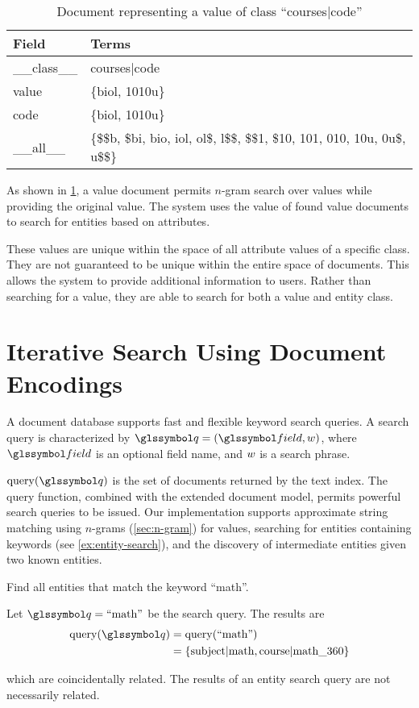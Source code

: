		\begin{table}[H]
			\centering
			\begin{tabular}{ll}
				\toprule
				Field & Terms \\
				\midrule
				\_\_class\_\_ & courses|code \\
				value & \{biol, 1010u\} \\
				code & \{biol, 1010u\} \\
				\_\_all\_\_ & \{\$\$b, \$bi, bio, iol, ol\$, l\$\$, \$\$1, \$10, 101, 010, 10u, 0u\$, u\$\$\} \\
				\bottomrule
			\end{tabular}
			
			\caption{Document representing a value of class ``courses|code''}
			\label{tbl:value-document}
		\end{table}
		
		As shown in \cref{tbl:value-document}, a value document permits \(n\)-gram search over values while providing the original value.  The system uses the value of found value documents to search for entities based on attributes.
		
		These values are unique within the space of all attribute values of a specific class.  They are not guaranteed to be unique within the entire space of documents.  This allows the system to provide additional information to users.  Rather than searching for a value, they are able to search for both a value and entity class.
	
	\section{Iterative Search Using Document Encodings}
		A document database supports fast and flexible keyword search queries.	A search query is characterized by \(\q = (\field, \w)\), where \(\field\) is an optional field name, and \(w\) is a search phrase.
		
		\(\query(\q)\) is the set of documents returned by the text index.  The query function, combined with the extended document model, permits powerful search queries to be issued.  Our implementation supports approximate string matching using \(n\)-grams (\cref{sec:n-gram}) for values, searching for entities containing keywords (see \vref{ex:entity-search}), and the discovery of intermediate entities given two known entities.
		
		\begin{ex}
		\label{ex:entity-search}
			Find all entities that match the keyword ``math''.
			
			Let \(\q = \text{``math''}\) be the search query.  The results are
			\begin{align*}
				\query(\q) &= \query(\text{``math''}) \\
				&= \{\text{subject|math}, \text{course|math\_360}\}
			\end{align*}
			
			which are coincidentally related.  The results of an entity search query are not necessarily related.
		\end{ex}
		
